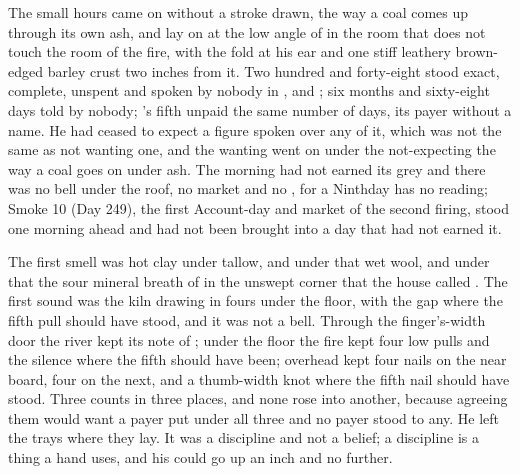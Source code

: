 
The small hours came on without a stroke drawn, the way a coal comes up through its own ash, and  lay on  at the low angle of  in the room that does not touch the room of the fire, with the fold at his ear and one stiff leathery brown-edged barley crust two inches from it. Two hundred and forty-eight stood exact, complete, unspent and spoken by nobody in ,  and ; six months and sixty-eight days told by nobody; 's fifth unpaid the same number of days, its payer without a name. He had ceased to expect a figure spoken over any of it, which was not the same as not wanting one, and the wanting went on under the not-expecting the way a coal goes on under ash. The morning had not earned its grey and there was no bell under the roof, no market and no , for a Ninthday has no reading; Smoke 10 (Day 249), the first Account-day and market of the second firing, stood one morning ahead and had not been brought into a day that had not earned it.

The first smell was hot clay under tallow, and under that wet wool, and under that the sour mineral breath of  in the unswept corner that the house called . The first sound was the kiln drawing in fours under the floor, with the gap where the fifth pull should have stood, and it was not a bell. Through the finger's-width door the river kept its note of ; under the floor the fire kept four low pulls and the silence where the fifth should have been; overhead  kept four nails on the near board, four on the next, and a thumb-width knot where the fifth nail should have stood. Three counts in three places, and none rose into another, because agreeing them would want a payer put under all three and no payer stood to any. He left the trays where they lay. It was a discipline and not a belief; a discipline is a thing a hand uses, and his could go up an inch and no further.

